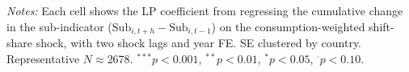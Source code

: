 \begin{table}[htbp]
\begin{threeparttable}
\begin{tablenotes}\small
\item \textit{Notes:} Each cell shows the LP coefficient from regressing the cumulative change in the sub-indicator ($\text{Sub}_{i,t+h} - \text{Sub}_{i,t-1}$) on the consumption-weighted shift-share shock, with two shock lags and year FE. SE clustered by country. Representative $N \approx 2678$. $^{***}p<0.001$, $^{**}p<0.01$, $^{*}p<0.05$, $^{\cdot}p<0.10$.
\end{tablenotes}\end{threeparttable}\end{table}
